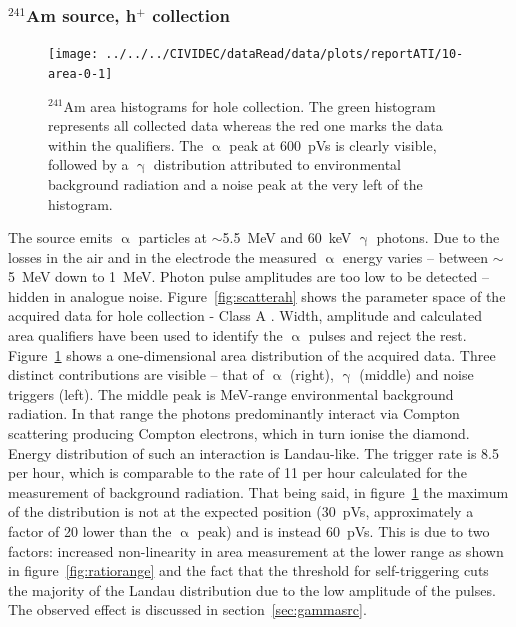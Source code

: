 \clearpage
\subsubsection{$^{241}$Am source, h$^+$ collection}
\label{sec:amsrch}
\begin{figure}[]
\centering
\texttt{[image: ../../../CIVIDEC/dataRead/data/plots/reportATI/10-area-0-1]}
\caption{$^{241}$Am area histograms for hole collection. The green histogram represents all collected data whereas the red one marks the data within the qualifiers. The $\upalpha$ peak at 600~pVs is clearly visible, followed by a $\upgamma$ distribution attributed to environmental background radiation and a noise peak at the very left of the histogram. 
}
\label{fig:1dalphaareah}
\end{figure}
The source emits $\upalpha$ particles at $\sim$5.5~MeV and 60~keV $\upgamma$ photons. Due to the losses in the air and in the electrode the measured $\upalpha$ energy varies -- between $\sim$5~MeV down to 1~MeV.  Photon pulse amplitudes are too low to be detected -- hidden in analogue noise. Figure~\ref{fig:scatterah} shows the parameter space of the acquired data for hole collection - Class A . Width, amplitude and calculated area qualifiers have been used to identify the $\upalpha$ pulses and reject the rest. Figure~\ref{fig:1dalphaareah} shows a one-dimensional area distribution of the acquired data.  Three distinct contributions are visible -- that of $\upalpha$ (right), $\upgamma$ (middle) and noise triggers (left). The middle peak is MeV-range environmental background radiation. In that range the photons predominantly interact via Compton scattering producing Compton electrons, which in turn ionise the diamond. Energy distribution of such an interaction is Landau-like. The trigger rate is 8.5 per hour, which is comparable to the rate of 11 per hour calculated for the measurement of background radiation. That being said, in figure~\ref{fig:1dalphaareah} the maximum of the distribution is not at the expected position (30~pVs, approximately a factor of 20 lower than the $\upalpha$ peak) and is instead 60~pVs.
This is due to two factors: increased non-linearity in area measurement at the lower range as shown in figure~\ref{fig:ratiorange} and the fact that the threshold for self-triggering cuts the majority of the Landau distribution due to the low amplitude of the pulses. 
The observed effect is discussed in section~\ref{sec:gammasrc}.

